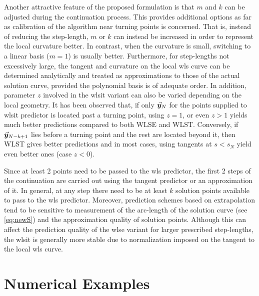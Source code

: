 Another attractive feature of the proposed formulation is that $m$ and $k$ can
be adjusted during the continuation process. This provides additional options 
as far as calibration of the algorithm near turning
points is concerned. That is, instead of reducing the step-length, $m$ or $k$
can instead be increased in order to represent the local curvature better. In
contrast, when the curvature is small, switching to a linear basis ($m=1$) is
usually better.
Furthermore, for step-lengths not excessively large, the tangent and curvature 
on the local \acrshort{wls} curve can be determined analytically and treated as
approximations to those of the actual solution curve, provided the polynomial
basis is of adequate order. In addition, parameter $z$ involved in the 
\acrshort{wlsit}
variant can also be varied depending on the local geometry. It has been
observed that, if only $\vec{\bm{y}}_N$ for the points supplied to \acrshort{wlsit} 
predictor is located past a 
turning point,
using $z=1$, or even $z>1$ yields much better predictions compared
to both WLSE and WLST. Conversely, if $\vec{\bm{y}}_{N-k+1}$  lies before a turning
point and the rest are located beyond it, then WLST gives better predictions and
in most cases, using tangents at $s<s_N$ yield even better ones (case $z<0$). 

Since at least 2 points need to be passed to the \acrshort{wls} predictor, the 
first 2
steps of the continuation are carried out using the tangent predictor or an
approximation of it. In general, at any step there need to be at least $k$
solution points available to pass to the \acrshort{wls} predictor. Moreover, 
prediction
schemes based on extrapolation tend to be sensitive to measurement of the
arc-length of the solution curve (see \ref{eq:newS}) and the approximation 
quality of solution points\cite{Lundberg91,Mackens89}. Although this can affect 
the prediction quality of the \acrshort{wlse} variant
for larger prescribed step-lengths, the \acrshort{wlsit} is generally more 
stable due to normalization imposed on the tangent to the local \acrshort{wls} 
curve. 


\section{Numerical Examples}\label{CH5-S4}

